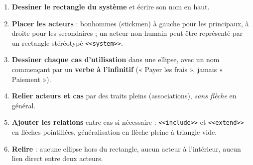 \documentclass[11pt]{article}
\newcommand{\cle}[1]{{\popxbold\color{popdark}#1}}
\begin{document}
\begin{methode}
\begin{enumerate}
\item \textbf{Dessiner le rectangle du système} et écrire son nom en haut.
\item \textbf{Placer les acteurs} : bonhommes (stickmen) à gauche pour les principaux, à droite pour les secondaires ; un acteur non humain peut être représenté par un rectangle stéréotypé \texttt{<<system>>}.
\item \textbf{Dessiner chaque cas d'utilisation} dans une \cle{ellipse}, avec un nom commençant par un \textbf{verbe à l'infinitif} (« Payer les frais », jamais « Paiement »).
\item \textbf{Relier acteurs et cas} par des traits pleins (associations), \emph{sans flèche} en général.
\item \textbf{Ajouter les relations} entre cas si nécessaire : \texttt{<<include>>} et \texttt{<<extend>>} en flèches pointillées, généralisation en flèche pleine à triangle vide.
\item \textbf{Relire} : aucune ellipse hors du rectangle, aucun acteur à l'intérieur, aucun lien direct entre deux acteurs.
\end{enumerate}
\end{methode}
\end{document}
